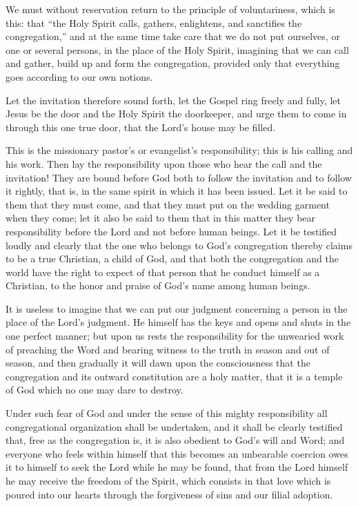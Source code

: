 We must without reservation return to the principle of voluntariness, which is this: that “the Holy Spirit calls, gathers, enlightens, and sanctifies the congregation,” and at the same time take care that we do not put ourselves, or one or several persons, in the place of the Holy Spirit, imagining that we can call and gather, build up and form the congregation, provided only that everything goes according to our own notions.

Let the invitation therefore sound forth, let the Gospel ring freely and fully, let Jesus be the door and the Holy Spirit the doorkeeper, and urge them to come in through this one true door, that the Lord’s house may be filled.

This is the missionary pastor’s or evangelist’s responsibility; this is his calling and his work. Then lay the responsibility upon those who hear the call and the invitation! They are bound before God both to follow the invitation and to follow it rightly, that is, in the same spirit in which it has been issued. Let it be said to them that they must come, and that they must put on the wedding garment when they come; let it also be said to them that in this matter they bear responsibility before the Lord and not before human beings. Let it be testified loudly and clearly that the one who belongs to God’s congregation thereby claims to be a true Christian, a child of God, and that both the congregation and the world have the right to expect of that person that he conduct himself as a Christian, to the honor and praise of God’s name among human beings.

It is useless to imagine that we can put our judgment concerning a person in the place of the Lord’s judgment. He himself has the keys and opens and shuts in the one perfect manner; but upon us rests the responsibility for the unwearied work of preaching the Word and bearing witness to the truth in season and out of season, and then gradually it will dawn upon the consciousness that the congregation and its outward constitution are a holy matter, that it is a temple of God which no one may dare to destroy.

Under such fear of God and under the sense of this mighty responsibility all congregational organization shall be undertaken, and it shall be clearly testified that, free as the congregation is, it is also obedient to God’s will and Word; and everyone who feels within himself that this becomes an unbearable coercion owes it to himself to seek the Lord while he may be found, that from the Lord himself he may receive the freedom of the Spirit, which consists in that love which is poured into our hearts through the forgiveness of sins and our filial adoption.

